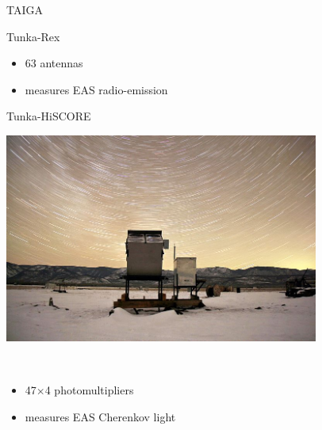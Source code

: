 \begin{frame}{TAIGA}
\begin{minipage}[t]{0.31\textwidth}
\begin{block}{\small Tunka-Rex}
{    }
    \\
    \parbox[c][0.15\textheight][t]{1\textwidth}{
      \begin{itemize}
        \setlength{\itemsep}{0pt}
        \item 63 antennas
        \item measures EAS radio-emission
      \end{itemize}
    }
  \end{block}
\end{minipage}
\hfill
\begin{minipage}[t]{0.31\textwidth}
  \begin{block}{\small Tunka-HiSCORE}
    \parbox[c][0.20\textheight][t]{1\textwidth}{
      \centering
      \includegraphics[width=0.7742\textwidth]{pics/Tunka-HiSCORE.jpg}
    }
    \\
    \parbox[c][0.15\textheight][t]{1.1\textwidth}{
      \begin{itemize}
        \setlength{\itemsep}{0pt}
        \item 47$\times$4 photomultipliers
        \item measures EAS Cherenkov light
      \end{itemize}
    }
  \end{block}
\end{minipage}


\end{frame}
